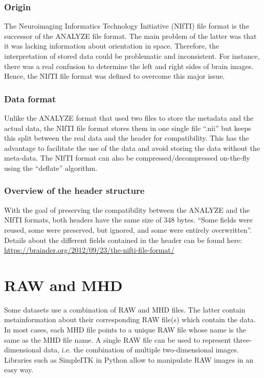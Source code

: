 \subsubsection{Origin}
The Neuroimaging Informatics Technology Initiative (NIfTI) file format is the successor of the ANALYZE file format. The main problem of the latter was that it was lacking information about orientation in space. Therefore, the interpretation of stored data could be problematic and inconsistent. For instance, there was a real confusion to determine the left and right sides of brain images. Hence, the NIfTI file format was defined to overcome this major issue.


\subsubsection{Data format}
Unlike the ANALYZE format that used two files to store the metadata and the actual data, the NIfTI file format stores them in one single file “.nii” but keeps this split between the real data and the header for compatibility. This has the advantage to facilitate the use of the data and avoid storing the data without the meta-data. The NIfTI format can also be compressed/decompressed on-the-fly using the “deflate”  algorithm.


\subsubsection{Overview of the header structure}
With the goal of preserving the compatibility between the ANALYZE and the NIfTI formats, both headers have the same size of 348 bytes. “Some fields were reused, some were preserved, but ignored, and some were entirely overwritten”. Details about the different fields contained in the header can be found here: \url{https://brainder.org/2012/09/23/the-nifti-file-format/}


\section{RAW and MHD}

Some datasets use a combination of RAW and MHD files. The latter contain metainformation about their corresponding RAW file(s) which contain the data. In most cases, each MHD file points to a unique RAW file whose name is the same as the MHD file name. A single RAW file can be used to represent three-dimensional data, i.e. the combination of multiple two-dimensional images. Libraries such as \mbox{SimpleITK} in Python allow to manipulate RAW images in an easy way. 


